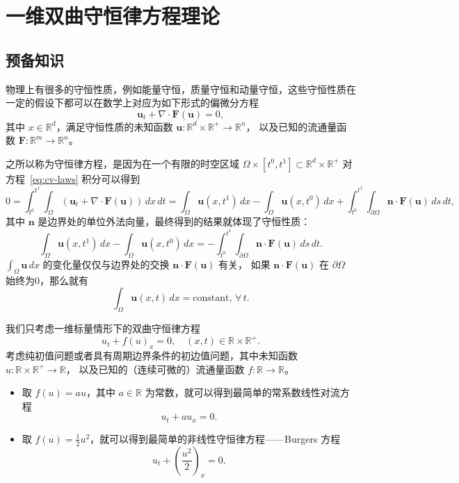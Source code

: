 \chapter{一维双曲守恒律方程理论}

\section{预备知识}

物理上有很多的守恒性质，例如能量守恒，质量守恒和动量守恒，这些守恒性质在一定的假设下都可以在数学上对应为如下形式的偏微分方程
\begin{equation}
    \bm{u}_t + \nabla \cdot \bm{F}(\bm{u}) = 0,
    \label{eq:cv-laws}
\end{equation}
其中 $x \in \mathbb{R}^d$，满足守恒性质的未知函数 $\bm{u}: \mathbb{R}^d \times \mathbb{R}^+ \to \mathbb{R}^n$，
以及已知的流通量函数 $\bm{F}:\mathbb{R}^m \to \mathbb{R}^n$。

之所以称为守恒律方程，是因为在一个有限的时空区域 $\Omega \times [t^0,t^1] \subset \mathbb{R}^d \times  \mathbb{R}^+$ 对方程~\eqref{eq:cv-laws} 积分可以得到
\[
    0 = \int_{t^0}^{t^1} \int_{\Omega} \left(\bm{u}_t + \nabla \cdot \bm{F}(\bm{u})\right) \,dx\,dt
    = \int_{\Omega} \bm{u}(x,t^1)\,dx - \int_{\Omega} \bm{u}(x,t^0)\,dx
    + \int_{t^0}^{t^1} \int_{\partial \Omega} \bm{n} \cdot \bm{F}(\bm{u}) \,ds\,dt,
\]
其中 $\bm{n}$ 是边界处的单位外法向量，最终得到的结果就体现了守恒性质：
\[
    \int_{\Omega} \bm{u}(x,t^1)\,dx - \int_{\Omega} \bm{u}(x,t^0)\,dx
    = - \int_{t^0}^{t^1}\int_{\partial \Omega} \bm{n} \cdot \bm{F}(\bm{u}) \,ds\,dt.
\]
$\int_{\Omega} \bm{u}\,dx$ 的变化量仅仅与边界处的交换 $\bm{n} \cdot \bm{F}(\bm{u})$ 有关，
如果 $\bm{n} \cdot \bm{F}(\bm{u})$ 在 $\partial \Omega$ 始终为0，那么就有
\[
    \int_{\Omega} \bm{u}(x,t)\,dx = \text{constant},\,\forall\, t.
\]

我们只考虑一维标量情形下的双曲守恒律方程
\begin{equation}
    u_t + f(u)_x = 0,\quad (x,t) \in \mathbb{R} \times  \mathbb{R}^+.
    \label{eq:cv-law-scalar}
\end{equation}
考虑纯初值问题或者具有周期边界条件的初边值问题，其中未知函数 $u: \mathbb{R} \times  \mathbb{R}^+ \to \mathbb{R}$，
以及已知的（连续可微的）流通量函数 $f:\mathbb{R} \to \mathbb{R}$。

\begin{example}
    \noindent
    \begin{itemize}
        \item 取 $f(u) = a u$，其中 $a \in \mathbb{R}$ 为常数，就可以得到最简单的常系数线性对流方程
              \[
                  u_t + a u_x = 0.
              \]
        \item 取 $f(u) = \frac12 u^2$，就可以得到最简单的非线性守恒律方程——Burgers 方程
              \[
                  u_t + \left(\frac{u^2}2\right)_x = 0.
              \]
    \end{itemize}
\end{example}

